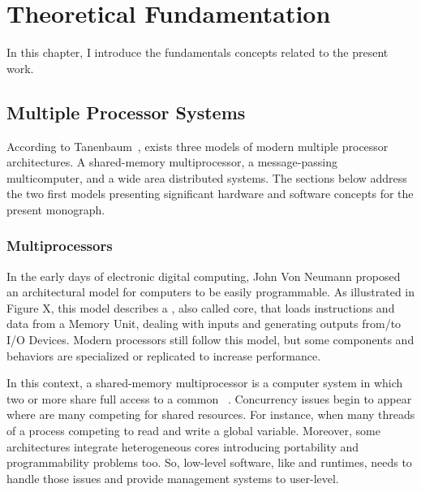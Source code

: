 \chapter{Theoretical Fundamentation} %
\label{ch.fundamentation}

	In this chapter, I introduce the fundamentals concepts related to the present work.



\section{Multiple Processor Systems}
\label{sec.multiple_processor_systems}

	According to Tanenbaum~\cite{tanenbaum:4ed}, exists three models of modern
	multiple processor architectures.
	A shared-memory multiprocessor, a message-passing multicomputer, and a wide
	area distributed systems.
	The sections below address the two first models presenting significant
	hardware and software concepts for the present monograph.

	\subsection{Multiprocessors}

		In the early days of electronic digital computing, John Von Neumann
		proposed an architectural model for computers to be easily programmable.
		As illustrated in Figure X, this model describes a \cpu,
		also called core, that loads instructions and data from a Memory Unit,
		dealing with inputs and generating outputs from/to I/O Devices.
		Modern processors still follow this model, but some components and
		behaviors are specialized or replicated to increase performance.

		In this context, a shared-memory multiprocessor is a computer system
		in which two or more \cpus share full access to a common \ram~\cite{tanenbaum:4ed}.
		Concurrency issues begin to appear where are many \cpus competing for
		shared resources.
		For instance, when many threads of a process competing to read and write a global variable.
		Moreover, some architectures integrate heterogeneous cores introducing portability
		and programmability problems too.
		So, low-level software, like \oses and runtimes, needs to handle those
		issues and provide management systems to user-level.

